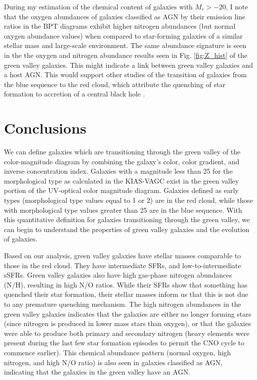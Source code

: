 During my estimation of the chemical content of galaxies with $M_r > -20$, I 
note that the oxygen abundances of galaxies classified as AGN by their 
emission line ratios in the BPT diagrams exhibit higher nitrogen abundances 
(but normal oxygen abundance values) when compared to star-forming galaxies of 
a similar stellar mass and large-scale environment.  The same abundance 
signature is seen in the the oxygen and nitrogen abundance results seen in Fig. 
\ref{fig:Z_hist} of the green valley galaxies.  This might indicate a 
link between green valley galaxies and a host AGN.  This would support other 
studies of the transition of galaxies from the blue sequence to the red cloud, 
which attribute the quenching of star formation to accretion of a central black 
hole \citep[e.g.,][]{Croton06,Stasinska08}.





\section[Conclusions]{Conclusions}

We can define galaxies which are transitioning through the green valley of the 
color-magnitude diagram by combining the galaxy's color, color gradient, and 
inverse concentration index.  Galaxies with a magnitude less than 25 for the 
morphological type as calculated in the KIAS-VAGC exist in the green valley 
portion of the UV-optical color magnitude diagram.  Galaxies defined as early 
types (morphological type values equal to 1 or 2) are in the red cloud, while 
those with morphological type values greater than 25 are in the blue sequence.  
With this quantitative definition for galaxies transitioning through the green 
valley, we can begin to understand the properties of green valley galaxies and 
the evolution of galaxies.

Based on our analysis, green valley galaxies have stellar masses comparable to 
those in the red cloud.  They have intermediate SFRs, and low-to-intermediate 
sSFRs.  Green valley galaxies also have high gas-phase nitrogen abundances (N/H), 
resulting in high N/O ratios.  While their SFRs show that something has quenched 
their star formation, their stellar masses inform us that this is not due to any 
premature quenching mechanism.  The high nitrogen abundances in the green valley 
galaxies indicates that the galaxies are either no longer forming stars (since 
nitrogen is produced in lower mass stars than oxygen), or that the galaxies were 
able to produce both primary and secondary nitrogen (heavy elements were present 
during the last few star formation episodes to permit the CNO cycle to commence 
earlier).  This chemical abundance pattern (normal oxygen, high nitrogen, and 
high N/O ratio) is also seen in galaxies classified as AGN, indicating that the 
galaxies in the green valley have an AGN.

